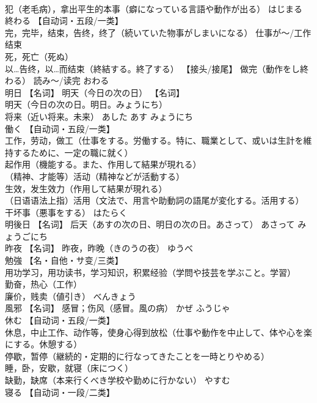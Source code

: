\documentclass[8pt]{extreport}
\begin{document}
\begin{CJK}{UTF8}{min}
\\	犯（老毛病），拿出平生的本事（癖になっている言語や動作が出る）	はじまる	
\\	終わる	【自动词・五段/一类】 
\\	完，完毕，结束，告终，终了（続いていた物事がしまいになる） 仕事が〜/工作结束 
\\	死，死亡（死ぬ） 
\\	以…告终，以…而结束（終結する。終了する） 【接头/接尾】 做完（動作をし終わる） 読み〜/读完	おわる	
\\	明日	【名词】 明天（今日の次の日） 【名词】 
\\	明天（今日の次の日。明日。みょうにち） 
\\	将来（近い将来。未来）	あした あす みょうにち	
\\	働く	【自动词・五段/一类】 
\\	工作，劳动，做工（仕事をする。労働する。特に、職業として、或いは生計を維持するために、一定の職に就く） 
\\	起作用（機能する。また、作用して結果が現れる） 
\\	（精神、才能等）活动（精神などが活動する） 
\\	生效，发生效力（作用して結果が現れる） 
\\	（日语语法上指）活用（文法で、用言や助動詞の語尾が変化する。活用する） 
\\	干坏事（悪事をする）	はたらく	
\\	明後日	【名词】 后天（あすの次の日、明日の次の日。あさって）	あさって みょうごにち	
\\	昨夜	【名词】 昨夜，昨晚（きのうの夜）	ゆうべ	
\\	勉強	【名・自他・サ变/三类】 
\\	用功学习，用功读书，学习知识，积累经验（学問や技芸を学ぶこと。学習） 
\\	勤奋，热心（工作） 
\\	廉价，贱卖（値引き）	べんきょう	
\\	風邪	【名词】 感冒；伤风（感冒。風の病）	かぜ ふうじゃ	
\\	休む	【自动词・五段/一类】 
\\	休息，中止工作、动作等，使身心得到放松（仕事や動作を中止して、体や心を楽にする。休憩する） 
\\	停歇，暂停（継続的・定期的に行なってきたことを一時とりやめる） 
\\	睡，卧，安歇，就寝（床につく） 
\\	缺勤，缺席（本来行くべき学校や勤めに行かない）	やすむ	
\\	寝る	【自动词・一段/二类】 

\end{CJK}
\end{document}

